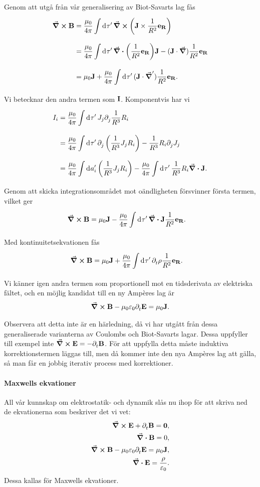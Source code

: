 Genom att utgå från vår generalisering av Biot-Savarts lag fås
\begin{align*}
	\curl{\vb{B}} &= \frac{\mu_{0}}{4\pi}\int\limits_{}^{}\dd[]{\tau'}\curl(\vb{J}\times\frac{1}{R^{2}}\vb{e}_{\vb{R}}) \\
	              &= \frac{\mu_{0}}{4\pi}\int\limits_{}^{}\dd[]{\tau'}\div(\frac{1}{R^{2}}\vb{e}_{\vb{R}})\vb{J} - (\vb{J}\cdot\grad)\frac{1}{R^{2}}\vb{e}_{\vb{R}} \\
	              &= \mu_{0}\vb{J} + \frac{\mu_{0}}{4\pi}\int\limits_{}^{}\dd[]{\tau'}(\vb{J}\cdot\grad')\frac{1}{R^{2}}\vb{e}_{\vb{R}}.
\end{align*}
Vi betecknar den andra termen som $\vb{I}$. Komponentvis har vi
\begin{align*}
	I_{i} &= \frac{\mu_{0}}{4\pi}\int\limits_{}^{}\dd[]{\tau'}J_{j}\partial_{j}^{}\frac{1}{R^{3}}R_{i} \\
	      &= \frac{\mu_{0}}{4\pi}\int\limits_{}^{}\dd[]{\tau'}\partial_{j}^{}\left(\frac{1}{R^{3}}J_{j}R_{i}\right) - \frac{1}{R^{3}}R_{i}\partial_{j}^{}J_{j} \\
	      &= \frac{\mu_{0}}{4\pi}\int\limits_{}^{}\dd[]{a_{i}'}\left(\frac{1}{R^{3}}J_{j}R_{i}\right) - \frac{\mu_{0}}{4\pi}\int\limits_{}^{}\dd[]{\tau'}\frac{1}{R^{3}}R_{i}\div{\vb{J}}.
\end{align*}
Genom att skicka integrationsområdet mot oändligheten försvinner första termen, vilket ger
\begin{align*}
	\curl{\vb{B}} &= \mu_{0}\vb{J} - \frac{\mu_{0}}{4\pi}\int\limits_{}^{}\dd[]{\tau'}\div{\vb{J}}\frac{1}{R^{2}}\vb{e}_{\vb{R}}.
\end{align*}
Med kontinuitetsekvationen fås
\begin{align*}
	\curl{\vb{B}} &= \mu_{0}\vb{J} + \frac{\mu_{0}}{4\pi}\int\limits_{}^{}\dd[]{\tau'}\partial_{t}^{}\rho\frac{1}{R^{2}}\vb{e}_{\vb{R}}.
\end{align*}
Vi känner igen andra termen som proportionell mot en tidsderivata av elektriska fältet, och en möjlig kandidat till en ny Ampères lag är
\begin{align*}
	\curl{\vb{B}} - \mu_{0}\varepsilon_{0}\partial_{t}^{}\vb{E} = \mu_{0}\vb{J}.
\end{align*}

Observera att detta inte är en härledning, då vi har utgått från dessa generaliserade varianterna av Coulombs och Biot-Savarts lagar. Dessa uppfyller till exempel inte $\curl{\vb{E}} = -\partial_{t}^{}\vb{B}$. För att uppfylla detta måste induktiva korrektionstermen läggas till, men då kommer inte den nya Ampères lag att gälla, så man får en jobbig iterativ process med korrektioner.

\paragraph{Maxwells ekvationer}
All vår kunnskap om elektrostatik- och dynamik slås nu ihop för att skriva ned de ekvationerna som beskriver det vi vet:
\begin{align*}
	\curl{\vb{E}} + \partial_{t}^{}\vb{B} = \vb{0}, \\
	\div{\vb{B}} = 0, \\
	\curl{\vb{B}} - \mu_{0}\varepsilon_{0}\partial_{t}^{}\vb{E} = \mu_{0}\vb{J}, \\
	\div{\vb{E}} = \frac{\rho}{\varepsilon_{0}}.
\end{align*}
Dessa kallas för Maxwells ekvationer.

